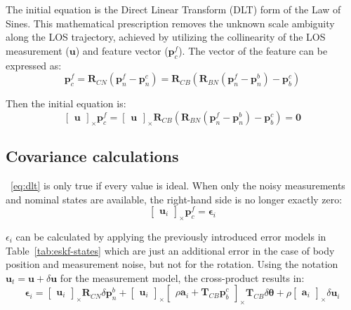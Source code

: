 The initial equation is the Direct Linear Transform (DLT) form of the Law of Sines. This mathematical prescription removes the unknown scale ambiguity along the LOS trajectory, achieved by utilizing the collinearity of the LOS measurement ($\mathbf{u}$) and feature vector ($\mathbf{p}_c^f$). The vector of the feature can be expressed as: 
\begin{equation}
    \mathbf{p}_c^f=\mathbf{R}_{CN}(\mathbf{p}_n^f-\mathbf{p}_n^c)=\mathbf{R}_{CB}(\mathbf{R}_{BN}(\mathbf{p}_n^f-\mathbf{p}_n^b)-\mathbf{p}_b^c)
    \label{eq:feature-in-cam}
\end{equation}

Then the initial equation is:
\begin{equation}
    \begin{bmatrix}
        \mathbf{u}
    \end{bmatrix}_\times\mathbf{p}_c^f=\begin{bmatrix}
        \mathbf{u}
    \end{bmatrix}_\times\mathbf{R}_{CB}(\mathbf{R}_{BN}(\mathbf{p}_n^f-\mathbf{p}_n^b)-\mathbf{p}_b^c)=\mathbf{0}
\end{equation}\label{eq:dlt}

\subsection{Covariance calculations}

~\eqref{eq:dlt} is only true if every value is ideal. When only the noisy measurements and nominal states are available, the right-hand side is no longer exactly zero:
\begin{equation}
    \begin{bmatrix}
        \mathbf{u}_i
    \end{bmatrix}_\times\mathbf{p}_c^f=\boldsymbol{\epsilon}_i
\end{equation}

$\epsilon_i$ can be calculated by applying the previously introduced error models in Table~\ref{tab:eskf-states} which are just an additional error in the case of body position and measurement noise, but not for the rotation. Using the notation $\mathbf{u}_t=\mathbf{u}+\delta\mathbf{u}$ for the measurement model, the cross-product results in:
\begin{equation}
    \boldsymbol{\epsilon}_i=\begin{bmatrix}
        \mathbf{u}_i
    \end{bmatrix}_\times\mathbf{R}_{CN}\delta\mathbf{p}_n^b +
    \begin{bmatrix}
        \mathbf{u}_i
    \end{bmatrix}_\times
    \begin{bmatrix}
    \rho\mathbf{a}_i+\mathbf{T}_{CB}\mathbf{p}_b^c
    \end{bmatrix}_\times\mathbf{T}_{CB}\delta\boldsymbol{\theta}+\rho\begin{bmatrix}
        \mathbf{a}_i
    \end{bmatrix}_\times\delta\mathbf{u}_i
    \label{eq:eps}
\end{equation}


